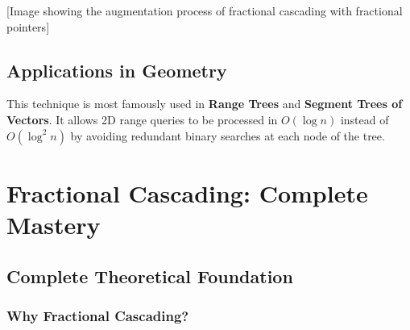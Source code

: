 \documentclass[11pt,a4paper,oneside]{book}
\begin{document}
[Image showing the augmentation process of fractional cascading with fractional pointers]

\subsection{Applications in Geometry}
This technique is most famously used in \textbf{Range Trees} and \textbf{Segment Trees of Vectors}. It allows 2D range queries to be processed in $O(\log n)$ instead of $O(\log^2 n)$ by avoiding redundant binary searches at each node of the tree.

\section{Fractional Cascading: Complete Mastery}

\subsection{Complete Theoretical Foundation}

\subsubsection{Why Fractional Cascading?}
\end{document}
